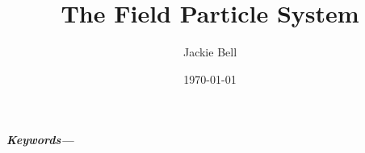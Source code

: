 \documentclass[11pt]{article}
\title{The Field Particle System}
\author{Jackie Bell}
\date{\today}
\providecommand{\keywords}[1]
{
  \small	
  \textbf{\textit{Keywords---}} #1
}
\begin{document}
\maketitle
\begin{abstract}
\end{abstract}

\keywords{
}










\end{document}
